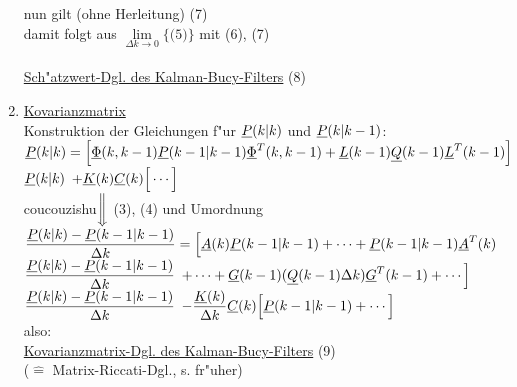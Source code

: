 \documentclass[openany,a4paper,11pt]{book}
\begin{document}
\begin{enumerate}
    nun gilt (ohne Herleitung)  \quad (7)\\[3pt]
    damit folgt aus $\displaystyle\mathop{\text{lim}}\limits_{\Delta k\rightarrow0}\Big\{\text{(5)}\Big\}$ mit (6), (7)\\
     \\[2pt]
    \uline{Sch"atzwert-Dgl. des Kalman-Bucy-Filters} \quad (8)
    \item \uline{Kovarianzmatrix}\\
    Konstruktion der Gleichungen f"ur $\uline{P}(k|k)$ und $\uline{P}(k|k-1)$:\\
    $\uline{P}(k|k)=\Big[\uline{\Phi}(k,k-1)\uline{P}(k-1|k-1)\uline{\Phi}^T(k,k-1)+\uline{L}(k-1)\uline{Q}(k-1)\uline{L}^T(k-1)\Big]$\\
    {\color{white} $\uline{P}(k|k)$} $+\uline{K}(k)\uline{C}(k)\Big[\cdots\Big]$\\
    {\color{white}coucouzishu}$\bigg\Downarrow$ (3), (4) und Umordnung\\
    $\displaystyle\frac{\uline{P}(k|k)-\uline{P}(k-1|k-1)}{\Delta k}=\Big[\uline{A}(k)\uline{P}(k-1|k-1)+\cdots+\uline{P}(k-1|k-1)\uline{A}^T(k)$\\
    {\color{white} $\displaystyle\frac{\uline{P}(k|k)-\uline{P}(k-1|k-1)}{\Delta k}$} $+\cdots+\uline{G}(k-1)(\uline{Q}(k-1)\Delta k)\uline{G}^T(k-1)+\cdots\Big]$\\
    {\color{white} $\displaystyle\frac{\uline{P}(k|k)-\uline{P}(k-1|k-1)}{\Delta k}$} $\displaystyle-\frac{\uline{K}(k)}{\Delta k}\uline{C}(k)\Big[\uline{P}(k-1|k-1)+\cdots\Big]$\\
    also: \\[2pt]
    \uline{Kovarianzmatrix-Dgl. des Kalman-Bucy-Filters} \quad (9)\\
    ($\hat{=}$ Matrix-Riccati-Dgl., s. fr"uher)
\end{enumerate}
\end{document}
